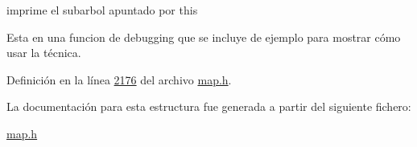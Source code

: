 imprime el subarbol apuntado por this 

\-Esta en una funcion de debugging que se incluye de ejemplo para mostrar cómo usar la técnica. 

\-Definición en la línea \hyperlink{map_8h_source_l02176}{2176} del archivo \hyperlink{map_8h_source}{map.\-h}.



\-La documentación para esta estructura fue generada a partir del siguiente fichero\-:\begin{DoxyCompactItemize}
\item 
\hyperlink{map_8h}{map.\-h}\end{DoxyCompactItemize}
